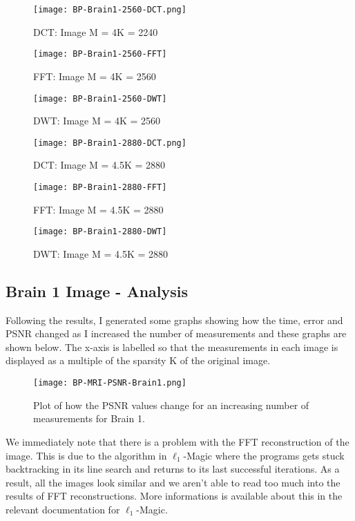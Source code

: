 \documentclass[titlepage,oneside, 12pt]{book}
\theoremstyle{break}
\begin{document}
\begin{figure}[!h]
\centering
{}
  \texttt{[image: BP-Brain1-2560-DCT.png]}
  \caption{DCT: Image M = 4K = 2240}\label{fig:BP-Brain1-2560-DCT}
\endminipage
\hspace*{2em}
  \texttt{[image: BP-Brain1-2560-FFT]}
  \caption{FFT: Image M = 4K = 2560}\label{fig:BP-Brain1-2560-FFT}
\endminipage
\hspace*{2em}
%
  \texttt{[image: BP-Brain1-2560-DWT]}
  \caption{DWT: Image M = 4K = 2560}\label{fig:BP-Brain1-2560-DWT}
\endminipage
\hspace*{2em}
\end{figure}

\begin{figure}[!h]
\centering
{}
  \texttt{[image: BP-Brain1-2880-DCT.png]}
  \caption{DCT: Image M = 4.5K = 2880}\label{fig:BP-Brain1-2880-DCT}
\endminipage
\hspace*{2em}
  \texttt{[image: BP-Brain1-2880-FFT]}
  \caption{FFT: Image M = 4.5K = 2880}\label{fig:BP-Brain1-2880-FFT}
\endminipage
\hspace*{2em}
%
  \texttt{[image: BP-Brain1-2880-DWT]}
  \caption{DWT: Image M = 4.5K = 2880}\label{fig:BP-Brain1-2880-DWT}
\endminipage
\hspace*{2em}
\end{figure}
\clearpage

\subsection{Brain 1 Image - Analysis}

Following the results, I generated some graphs showing how the time, error and PSNR changed as I increased the number of measurements and these graphs are shown below. The x-axis is labelled so that the measurements in each image is displayed as a multiple of the sparsity K of the original image. 

\begin{figure}[H]
\centering
\centerline{\texttt{[image: BP-MRI-PSNR-Brain1.png]}}
\caption{Plot of how the PSNR values change for an increasing number of measurements for Brain 1.}
\label{fig:BP-MRI-PSNR-Brain1}
\end{figure}

We immediately note that there is a problem with the FFT reconstruction of the image. This is due to the algorithm in $\ell_1$-Magic where the programs gets stuck backtracking in its line search and returns to its last successful iterations. As a result, all the images look similar and we aren't able to read too much into the results of FFT reconstructions. More informations is available about this in the relevant documentation for $\ell_1$-Magic.
\end{document}
